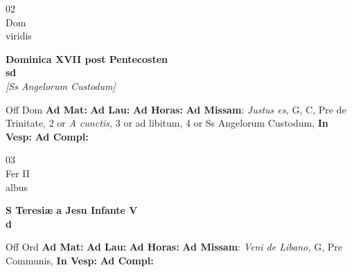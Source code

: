 \documentclass[10pt, openany]{book}
\begin{document}
        \begin{center}
            \begin{minipage}{3.5in}
                \vspace{2em}
                \begin{minipage}{0.5in}
                    {\Huge 02} \\
                    {\normalsize Dom} \\
                    {\normalsize viridis}
                \end{minipage}
                \begin{minipage}{3.0in}
                    \textbf{ \large Dominica XVII post Pentecosten \\
                    \textnormal{\normalsize sd}} \\ \textit{[Ss Angelorum Custodum]} \\ 
                \end{minipage}
                \begin{justify}Off Dom
                    \textbf{Ad Mat: }
                    \textbf{Ad Lau: }
                    \textbf{Ad Horas: }\textbf{Ad Missam}: \textit{Justus es,} G, C, Pre de Trinitate, 2 or \textit{A cunctis,} 3 or ad libitum, 4 or Ss Angelorum Custodum,  
                    \textbf{In Vesp: }
                    \textbf{Ad Compl: }
                \end{justify}
            \end{minipage}
        \end{center}
    
        \begin{center}
            \begin{minipage}{3.5in}
                \vspace{2em}
                \begin{minipage}{0.5in}
                    {\Huge 03} \\
                    {\normalsize Fer II} \\
                    {\normalsize albus}
                \end{minipage}
                \begin{minipage}{3.0in}
                    \textbf{ \large S Teresiæ a Jesu Infante V \\
                    \textnormal{\normalsize d}} \\ 
                \end{minipage}
                \begin{justify}Off Ord
                    \textbf{Ad Mat: }
                    \textbf{Ad Lau: }
                    \textbf{Ad Horas: }\textbf{Ad Missam}: \textit{Veni de Libano,} G, Pre Communis,  
                    \textbf{In Vesp: }
                    \textbf{Ad Compl: }
                \end{justify}
            \end{minipage}
        \end{center}
    
\end{document}
